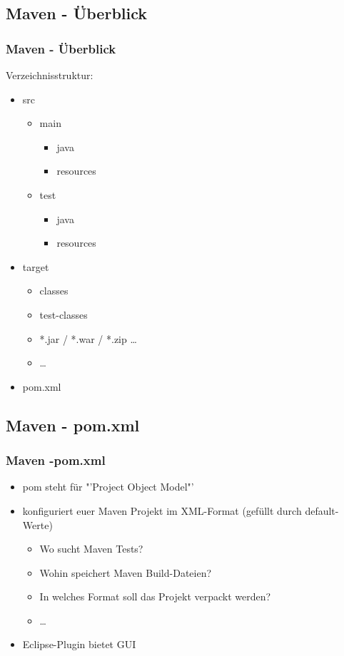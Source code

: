 \documentclass[18pt]{beamer}
\begin{document}
	\subsection{Maven - Überblick}
	\begin{frame}
		\frametitle{Maven - Überblick}
		Verzeichnisstruktur:
		\begin{itemize}
			\item src
			\begin{itemize}
				\item main
				\begin{itemize}
					\item java
					\item resources
				\end{itemize}
				\pause
				\item test
				\begin{itemize}
					\item java
					\item resources
				\end{itemize}
			\end{itemize}
			\pause
			\item target
			\begin{itemize}
				\item classes
				\item test-classes
				\item *.jar / *.war / *.zip \dots
				\item \dots
			\end{itemize}
			\pause
			\item pom.xml
		\end{itemize}
	\end{frame}
	
	\subsection{Maven - pom.xml}
	\begin{frame}
		\frametitle{Maven -pom.xml}
		\begin{itemize}
			\item pom steht für "'Project Object Model"'
			\item konfiguriert euer Maven Projekt im XML-Format (gefüllt durch default-Werte)
			\begin{itemize}
				\item Wo sucht Maven Tests? \pause
				\item Wohin speichert Maven Build-Dateien? \pause
				\item In welches Format soll das Projekt verpackt werden? \pause
				\item \dots
			\end{itemize}
			\item Eclipse-Plugin bietet GUI
		\end{itemize}
	\end{frame}
	
\end{document}
